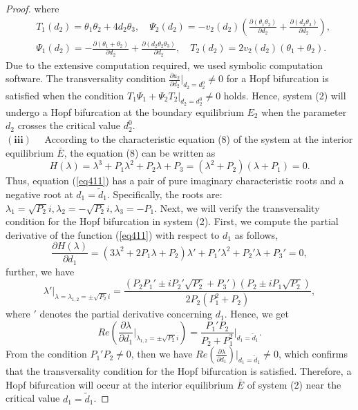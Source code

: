 \documentclass{ws-ijbc}
\begin{document}
\begin{proof}
where
\begin{equation*}
\begin{aligned}
&T_{1}(d_{2})=\theta_{1}\theta_{2}+4d_{2}\theta_{3},\quad \Psi_{2}(d_{2})=-v_{2}(d_{2})\left(\frac{\partial (\theta_{1}\theta_{2})}{\partial d_{2}}+\frac{\partial (d_{2}\theta_{3})}{\partial d_{2}}\right),\\
&\Psi_{1}(d_{2})=-\frac{\partial (\theta_{1}+\theta_{2})}{\partial d_{2}}+\frac{\partial (d_{2}\theta_{2}\theta_{3})}{\partial d_{2}},\quad T_{2}(d_{2})=2v_{2}(d_{2})(\theta_{1}+\theta_{2}).
\end{aligned}
\end{equation*}
Due to the extensive computation required, we used symbolic computation software. The transversality condition $\frac{\partial u_{2}}{\partial d_{2}}|_{ d_2=d_{2}^{0}}\neq0$ for a Hopf bifurcation is satisfied when the condition $T_{1}\Psi_{1} +\Psi_{2} T_{2}|_{ d_2=d_{2}^{0}}\neq0$ holds. Hence, system (2) will undergo a Hopf bifurcation at the boundary equilibrium $E_{2}$ when the parameter $d_{2}$ crosses the critical value $d_{2}^{0}$.\\
$\mathbf{(iii)}$~~
According to the characteristic equation (8) of the system at the interior equilibrium $\bar E$, the equation (8) can be written as 
\begin{equation}\label{eq411}
H(\lambda)=\lambda^{3}+P_{1}\lambda^{2}+P_{2}\lambda+P_{3}=(\lambda^{2}+P_{2})(\lambda+P_{1})=0.
\end{equation}
Thus, equation (\ref{eq411}) has a pair of pure imaginary characteristic roots and a negative root at $d_{1}=\tilde{d}_{1}$. Specifically, the roots are: $\lambda_{1}=\sqrt{P_{2}}i,\lambda_{2}=-\sqrt{P_{2}}i,\lambda_{3}=-P_{1}$. Next, we will verify the transversality condition for the Hopf bifurcation in system (2). First, we compute the partial derivative of the function (\ref{eq411}) with respect to $d_{1}$ as follows,
\begin{equation}\label{eq413}
\frac{\partial H(\lambda)}{\partial d_{1}}=(3\lambda^{2}+2P_{1}\lambda+P_{2})\lambda'+P_{1}'\lambda^{2}+P_{2}'\lambda+P_{3}'=0,
\end{equation}
further, we have
\begin{equation*}
\lambda'|_{\lambda=\lambda_{1,2}=\pm\sqrt{P_{2}}i}=\frac{\left(P_{2} P_{1}'\pm i P_{2}' \sqrt{P_{2}}+P_{3}'\right)\left(P_{2}\pm iP_{1} \sqrt{P_{2}}\right)}{2 P_{2} \left(P_{1}^{2}+P_{2}\right)},
\end{equation*}
where $'$ denotes the partial derivative concerning $d_{1}$. Hence, we get
\begin{equation}\label{eq414}
Re\left(\frac{\partial\lambda}{\partial d_{1}}|_{\lambda_{1,2}=\pm\sqrt{P_{2}}i}\right)=\frac{P_{1}'P_{2}}{P_{2}+P_{1}^{2}}|_{d_{1}=\tilde{d}_{1}}.
\end{equation}
From the condition $P_{1}'P_{2}\neq0$, then we have $Re(\frac{\partial\lambda}{\partial d_{1}})|_{d_{1}=\tilde{d}_{1}}\neq0$, which confirms that the transversality condition for the Hopf bifurcation is satisfied. Therefore, a Hopf bifurcation will occur at the interior equilibrium $\bar E$ of system (2) near the critical value $d_{1}=\tilde{d}_{1}$.
\end{proof}
\end{document}
